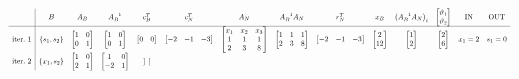 \begin{equation*}
\scalemath{0.65}{
\begin{array}{ c|c c c c c c c c c c c c c }
 & B & A_{B} & A_{B}^{-1} & c_{B}^{T} & c_{N}^{T} & A_{N} & A_{B}^{-1} A_{N} & r_{N}^{T} & x_{B} & \left( A_{B}^{-1} A_{N}\right)_{i} & \begin{bmatrix}
\vartheta _{1}\\
\vartheta _{2}
\end{bmatrix} & \text{IN} & \text{OUT}\\
\hline
\text{iter.} \ 1 & \{s_{1} ,s_{2}\} & \begin{bmatrix}
1 & 0\\
0 & 1
\end{bmatrix} & \begin{bmatrix}
1 & 0\\
0 & 1
\end{bmatrix} & \begin{bmatrix}
0 & 0
\end{bmatrix} & \begin{bmatrix}
-2 & -1 & -3
\end{bmatrix} & \begin{bmatrix}
x_{1} & x_{2} & x_{3}\\
1 & 1 & 1\\
2 & 3 & 8
\end{bmatrix} & \begin{bmatrix}
1 & 1 & 1\\
2 & 3 & 8
\end{bmatrix} & \begin{bmatrix}
-2 & -1 & -3
\end{bmatrix} & \begin{bmatrix}
2\\
12
\end{bmatrix} & \begin{bmatrix}
1\\
2
\end{bmatrix} & \begin{bmatrix}
2\\
6
\end{bmatrix} & x_{1} =2 & s_{1} =0\\
\text{iter.} \ 2 & \{x_{1} ,s_{2}\} & \begin{bmatrix}
1 & 0\\
2 & 1
\end{bmatrix} & \begin{bmatrix}
1 & 0\\
-2 & 1
\end{bmatrix} & \begin{bmatrix}

\end{bmatrix}
\end{array}}
\end{equation*}
